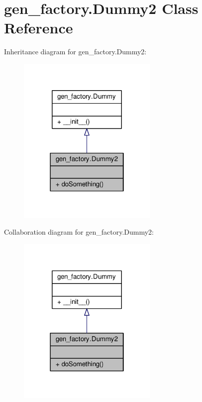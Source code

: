 \hypertarget{classgen__factory_1_1_dummy2}{}\section{gen\+\_\+factory.\+Dummy2 Class Reference}
\label{classgen__factory_1_1_dummy2}


Inheritance diagram for gen\+\_\+factory.\+Dummy2\+:\nopagebreak
\begin{figure}[H]
\begin{center}
\leavevmode
\includegraphics[width=190pt]{classgen__factory_1_1_dummy2__inherit__graph}
\end{center}
\end{figure}


Collaboration diagram for gen\+\_\+factory.\+Dummy2\+:\nopagebreak
\begin{figure}[H]
\begin{center}
\leavevmode
\includegraphics[width=190pt]{classgen__factory_1_1_dummy2__coll__graph}
\end{center}
\end{figure}
